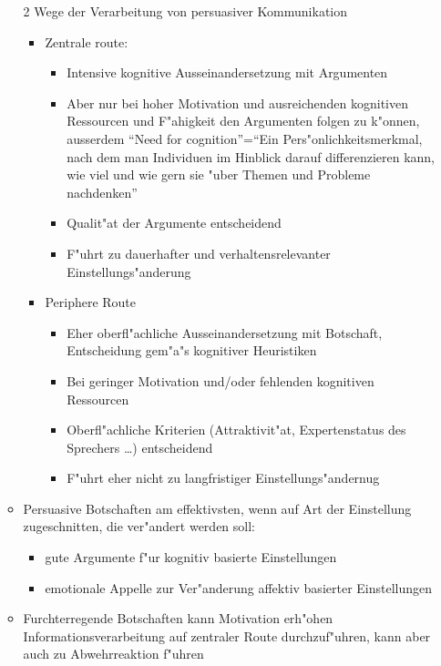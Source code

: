 \begin{itemize}
\begin{itemize}
				2 Wege der Verarbeitung von persuasiver Kommunikation
				\begin{itemize}
					\item
						Zentrale route:
						\begin{itemize}
							\item
								Intensive kognitive Ausseinandersetzung mit Argumenten
							\item
								Aber nur bei hoher Motivation und ausreichenden kognitiven Ressourcen und F"ahigkeit den Argumenten folgen zu k"onnen, ausserdem \enquote{Need for cognition}=\enquote{Ein Pers"onlichkeitsmerkmal, nach dem man Individuen im Hinblick darauf differenzieren kann, wie viel und wie gern sie "uber Themen und Probleme nachdenken}
							\item
								Qualit"at der Argumente entscheidend
							\item
								F"uhrt zu dauerhafter und verhaltensrelevanter Einstellungs"anderung
						\end{itemize}
					\item
						Periphere Route
						\begin{itemize}
							\item
								Eher oberfl"achliche Ausseinandersetzung mit Botschaft, Entscheidung gem"a"s kognitiver Heuristiken
							\item
								Bei geringer Motivation und/oder fehlenden kognitiven Ressourcen
							\item
								Oberfl"achliche Kriterien (Attraktivit"at, Expertenstatus des Sprechers \dots) entscheidend
							\item
								F"uhrt eher nicht zu langfristiger Einstellungs"andernug
						\end{itemize}
				\end{itemize}
			\item
				Persuasive Botschaften am effektivsten, wenn auf Art der Einstellung zugeschnitten, die ver"andert werden soll:
				\begin{itemize}
					\item
						gute Argumente f"ur kognitiv basierte Einstellungen
					\item
						emotionale Appelle zur Ver"anderung affektiv basierter Einstellungen
				\end{itemize}
			\item
				Furchterregende Botschaften kann Motivation erh"ohen Informationsverarbeitung auf zentraler Route durchzuf"uhren, kann aber auch zu Abwehrreaktion f"uhren \\

\end{itemize}
\end{itemize}

